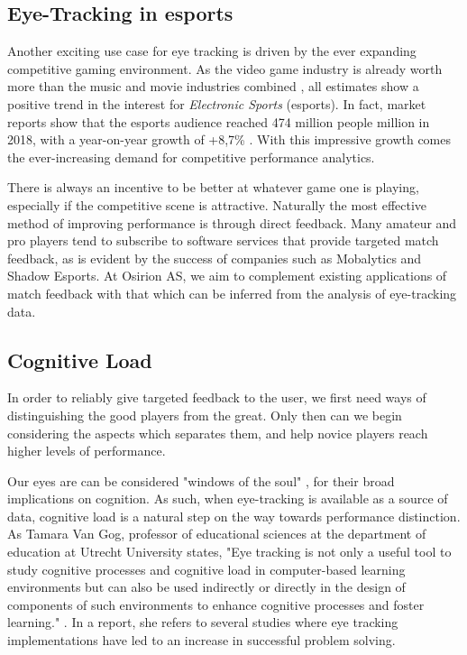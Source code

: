 \subsection{Eye-Tracking in esports}

Another exciting use case for eye tracking is driven by the ever expanding competitive gaming environment. As the video game industry is already worth more than the music and movie industries combined \cite{mangeloja2019}, all estimates show a positive trend in the interest for \textit{Electronic Sports} (esports). In fact, market reports show that the esports audience reached 474 million people million in 2018, with a year-on-year growth of +8,7\% \cite{newzoo2021}. With this impressive growth comes the ever-increasing demand for competitive performance analytics.

There is always an incentive to be better at whatever game one is playing, especially if the competitive scene is attractive. Naturally the most effective method of improving performance is through direct feedback. Many amateur and pro players tend to subscribe to software services that provide targeted match feedback, as is evident by the success of companies such as Mobalytics and Shadow Esports. At Osirion AS, we aim to complement existing applications of match feedback with that which can be inferred from the analysis of eye-tracking data.

\subsection{Cognitive Load}

In order to reliably give targeted feedback to the user, we first need ways of distinguishing the good players from the great. Only then can we begin considering the aspects which separates them, and help novice players reach higher levels of performance.

Our eyes are can be considered "windows of the soul" \cite{hess1965}, for their broad implications on cognition. As such, when eye-tracking is available as a source of data, cognitive load is a natural step on the way towards performance distinction. As Tamara Van Gog, professor of educational sciences at the department of education at Utrecht University states, "Eye tracking is not only a useful tool to study cognitive processes and cognitive load in computer-based learning environments but can also be used indirectly or directly in the design of components of such environments to enhance cognitive processes and foster learning." \cite{vanGog2013}. In a report, she refers to several studies where eye tracking implementations have led to an increase in successful problem solving.

